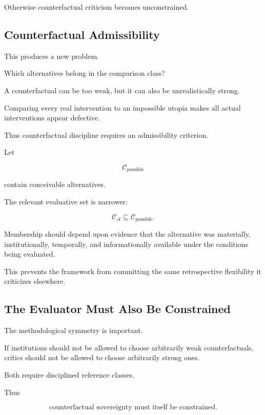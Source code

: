 \documentclass[11pt]{article}
\theoremstyle{remark}
\newcommand{\Adm}{\mathcal{A}}
\begin{document}
Otherwise counterfactual criticism becomes unconstrained.

\subsection{Counterfactual Admissibility}

This produces a new problem.

Which alternatives belong in the comparison class?

A counterfactual can be too weak, but it can also be unrealistically strong.

Comparing every real intervention to an impossible utopia makes all actual interventions appear defective.

Thus counterfactual discipline requires an admissibility criterion.

Let

\begin{equation}
\mathcal{C}_{\mathrm{possible}}
\end{equation}

contain conceivable alternatives.

The relevant evaluative set is narrower:

\begin{equation}
\mathcal{C}_{\Adm}
\subseteq
\mathcal{C}_{\mathrm{possible}}.
\end{equation}

Membership should depend upon evidence that the alternative was materially, institutionally, temporally, and informationally available under the conditions being evaluated.

This prevents the framework from committing the same retrospective flexibility it criticizes elsewhere.

\subsection{The Evaluator Must Also Be Constrained}

The methodological symmetry is important.

If institutions should not be allowed to choose arbitrarily weak counterfactuals, critics should not be allowed to choose arbitrarily strong ones.

Both require disciplined reference classes.

Thus

\begin{equation}
\boxed{
\text{counterfactual sovereignty must itself be constrained}.
}
\end{equation}
\end{document}
